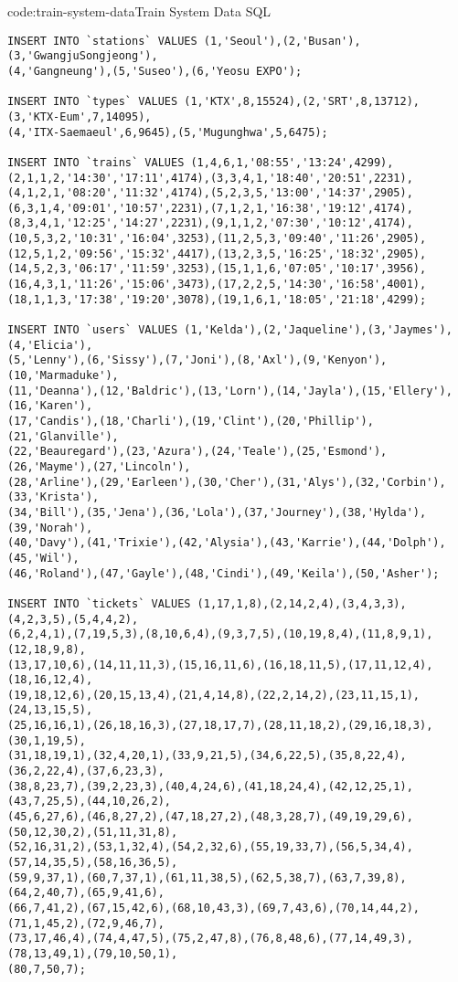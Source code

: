 \begin{codeenv}{code:train-system-data}{Train System Data SQL}\begin{verbatim}
INSERT INTO `stations` VALUES (1,'Seoul'),(2,'Busan'),(3,'GwangjuSongjeong'),
(4,'Gangneung'),(5,'Suseo'),(6,'Yeosu EXPO');

INSERT INTO `types` VALUES (1,'KTX',8,15524),(2,'SRT',8,13712),(3,'KTX-Eum',7,14095),
(4,'ITX-Saemaeul',6,9645),(5,'Mugunghwa',5,6475);

INSERT INTO `trains` VALUES (1,4,6,1,'08:55','13:24',4299),
(2,1,1,2,'14:30','17:11',4174),(3,3,4,1,'18:40','20:51',2231),
(4,1,2,1,'08:20','11:32',4174),(5,2,3,5,'13:00','14:37',2905),
(6,3,1,4,'09:01','10:57',2231),(7,1,2,1,'16:38','19:12',4174),
(8,3,4,1,'12:25','14:27',2231),(9,1,1,2,'07:30','10:12',4174),
(10,5,3,2,'10:31','16:04',3253),(11,2,5,3,'09:40','11:26',2905),
(12,5,1,2,'09:56','15:32',4417),(13,2,3,5,'16:25','18:32',2905),
(14,5,2,3,'06:17','11:59',3253),(15,1,1,6,'07:05','10:17',3956),
(16,4,3,1,'11:26','15:06',3473),(17,2,2,5,'14:30','16:58',4001),
(18,1,1,3,'17:38','19:20',3078),(19,1,6,1,'18:05','21:18',4299);

INSERT INTO `users` VALUES (1,'Kelda'),(2,'Jaqueline'),(3,'Jaymes'),(4,'Elicia'),
(5,'Lenny'),(6,'Sissy'),(7,'Joni'),(8,'Axl'),(9,'Kenyon'),(10,'Marmaduke'),
(11,'Deanna'),(12,'Baldric'),(13,'Lorn'),(14,'Jayla'),(15,'Ellery'),(16,'Karen'),
(17,'Candis'),(18,'Charli'),(19,'Clint'),(20,'Phillip'),(21,'Glanville'),
(22,'Beauregard'),(23,'Azura'),(24,'Teale'),(25,'Esmond'),(26,'Mayme'),(27,'Lincoln'),
(28,'Arline'),(29,'Earleen'),(30,'Cher'),(31,'Alys'),(32,'Corbin'),(33,'Krista'),
(34,'Bill'),(35,'Jena'),(36,'Lola'),(37,'Journey'),(38,'Hylda'),(39,'Norah'),
(40,'Davy'),(41,'Trixie'),(42,'Alysia'),(43,'Karrie'),(44,'Dolph'),(45,'Wil'),
(46,'Roland'),(47,'Gayle'),(48,'Cindi'),(49,'Keila'),(50,'Asher');

INSERT INTO `tickets` VALUES (1,17,1,8),(2,14,2,4),(3,4,3,3),(4,2,3,5),(5,4,4,2),
(6,2,4,1),(7,19,5,3),(8,10,6,4),(9,3,7,5),(10,19,8,4),(11,8,9,1),(12,18,9,8),
(13,17,10,6),(14,11,11,3),(15,16,11,6),(16,18,11,5),(17,11,12,4),(18,16,12,4),
(19,18,12,6),(20,15,13,4),(21,4,14,8),(22,2,14,2),(23,11,15,1),(24,13,15,5),
(25,16,16,1),(26,18,16,3),(27,18,17,7),(28,11,18,2),(29,16,18,3),(30,1,19,5),
(31,18,19,1),(32,4,20,1),(33,9,21,5),(34,6,22,5),(35,8,22,4),(36,2,22,4),(37,6,23,3),
(38,8,23,7),(39,2,23,3),(40,4,24,6),(41,18,24,4),(42,12,25,1),(43,7,25,5),(44,10,26,2),
(45,6,27,6),(46,8,27,2),(47,18,27,2),(48,3,28,7),(49,19,29,6),(50,12,30,2),(51,11,31,8),
(52,16,31,2),(53,1,32,4),(54,2,32,6),(55,19,33,7),(56,5,34,4),(57,14,35,5),(58,16,36,5),
(59,9,37,1),(60,7,37,1),(61,11,38,5),(62,5,38,7),(63,7,39,8),(64,2,40,7),(65,9,41,6),
(66,7,41,2),(67,15,42,6),(68,10,43,3),(69,7,43,6),(70,14,44,2),(71,1,45,2),(72,9,46,7),
(73,17,46,4),(74,4,47,5),(75,2,47,8),(76,8,48,6),(77,14,49,3),(78,13,49,1),(79,10,50,1),
(80,7,50,7);
\end{verbatim}
\end{codeenv}
